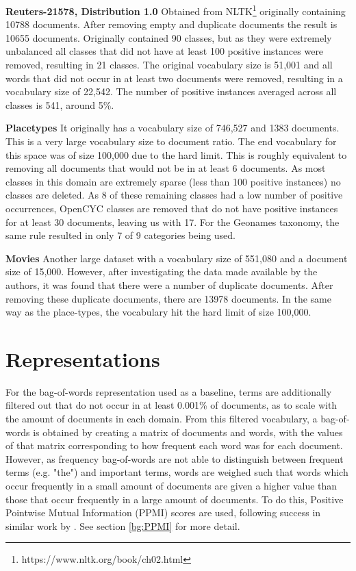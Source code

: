 \textbf{Reuters-21578, Distribution 1.0} Obtained from NLTK\footnote{https://www.nltk.org/book/ch02.html} originally containing 10788 documents. After removing empty and duplicate documents the result is 10655 documents. Originally contained 90 classes, but as they were extremely unbalanced all classes that did not have at least 100 positive instances were removed, resulting in 21 classes. The original vocabulary size is 51,001 and all words that did not occur in at least two documents were removed, resulting in a vocabulary size of 22,542. The number of positive instances averaged across all classes is 541, around 5\%. 

\textbf{Placetypes} It originally has a vocabulary size of 746,527 and 1383 documents. This is a very large vocabulary size to document ratio. The end vocabulary for this space was of size 100,000 due to the hard limit. This is roughly equivalent to removing all documents that would not be in at least 6 documents. As most classes in this domain are extremely sparse (less than 100 positive instances) no classes are deleted. As 8 of these remaining classes had a low number of positive occurrences, OpenCYC classes are removed that do not have positive instances for at least 30 documents, leaving us with 17. For the Geonames taxonomy, the same rule resulted in only 7 of 9 categories being used.

\textbf{Movies} Another large dataset with a vocabulary size of 551,080 and a document size of 15,000. However, after investigating the data made available by the authors, it was found that there were a number of duplicate documents. After removing these duplicate documents, there are 13978 documents. In the same way as the place-types, the vocabulary hit the hard limit of size 100,000. 



\section{Representations}

For the bag-of-words representation used as a baseline, terms are additionally filtered out that do not occur in at least 0.001\% of documents, as to scale with the amount of documents in each domain. From this filtered vocabulary, a bag-of-words is obtained by creating a matrix of documents and words, with  the values of that matrix corresponding to how frequent each word was for each document. However, as frequency bag-of-words are not able to distinguish between frequent terms (e.g. "the") and important terms, words are weighed such that words which occur frequently in a small amount of documents are given a higher value than those that occur frequently in a large amount of documents. To do this, Positive Pointwise Mutual Information (PPMI) scores are used, following success in similar work by \cite{Derrac2015}. See section \ref{bg:PPMI} for more detail.

